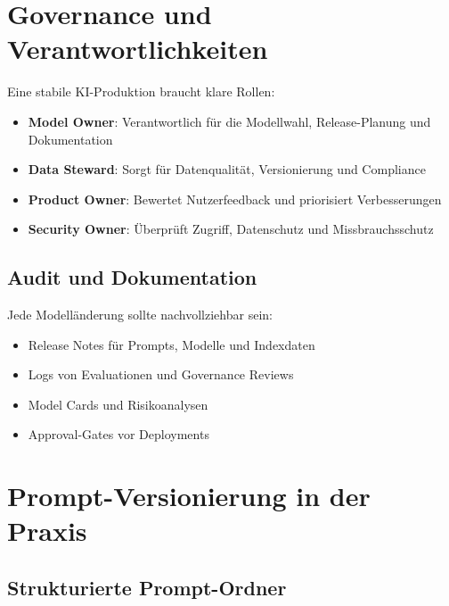 \section{Governance und Verantwortlichkeiten}

Eine stabile KI-Produktion braucht klare Rollen:

\begin{itemize}[leftmargin=*]
    \item \textbf{Model Owner}: Verantwortlich für die Modellwahl, Release-Planung und Dokumentation
    \item \textbf{Data Steward}: Sorgt für Datenqualität, Versionierung und Compliance
    \item \textbf{Product Owner}: Bewertet Nutzerfeedback und priorisiert Verbesserungen
    \item \textbf{Security Owner}: Überprüft Zugriff, Datenschutz und Missbrauchsschutz
\end{itemize}

\subsection{Audit und Dokumentation}

Jede Modelländerung sollte nachvollziehbar sein:

\begin{itemize}[leftmargin=*]
    \item Release Notes für Prompts, Modelle und Indexdaten
    \item Logs von Evaluationen und Governance Reviews
    \item Model Cards und Risikoanalysen
    \item Approval-Gates vor Deployments
\end{itemize}

\section{Prompt-Versionierung in der Praxis}

\subsection{Strukturierte Prompt-Ordner}

